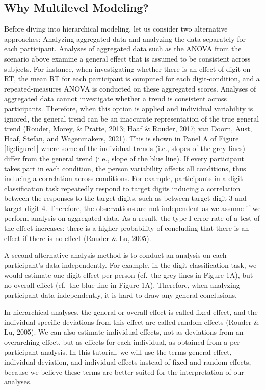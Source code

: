 \documentclass[
  english,
  doc,floatsintext]{apa6}
\begin{document}
\hypertarget{why-multilevel-modeling}{%
\subsection{Why Multilevel Modeling?}\label{why-multilevel-modeling}}

Before diving into hierarchical modeling, let us consider two alternative approaches: Analyzing aggregated data and analyzing the data separately for each participant. Analyses of aggregated data such as the ANOVA from the scenario above examine a general effect that is assumed to be consistent across subjects. For instance, when investigating whether there is an effect of digit on RT, the mean RT for each participant is computed for each digit-condition, and a repeated-measures ANOVA is conducted on these aggregated scores. Analyses of aggregated data cannot investigate whether a trend is consistent across participants. Therefore, when this option is applied and individual variability is ignored, the general trend can be an inaccurate representation of the true general trend (Rouder, Morey, \& Pratte, 2013; Haaf \& Rouder, 2017; van Doorn, Aust, Haaf, Stefan, and Wagenmakers, 2021). This is shown in Panel A of Figure \ref{fig:figure1} where some of the individual trends (i.e., slopes of the grey lines) differ from the general trend (i.e., slope of the blue line). If every participant takes part in each condition, the person variability affects all conditions, thus inducing a correlation across conditions. For example, participants in a digit classification task repeatedly respond to target digits inducing a correlation between the responses to the target digits, such as between target digit 3 and target digit 4. Therefore, the observations are not independent as we assume if we perform analysis on aggregated data. As a result, the type I error rate of a test of the effect increases: there is a higher probability of concluding that there is an effect if there is no effect (Rouder \& Lu, 2005).

A second alternative analysis method is to conduct an analysis on each participant's data independently. For example, in the digit classification task, we would estimate one digit effect per person (cf.~the grey lines in Figure 1A), but no overall effect (cf.~the blue line in Figure 1A). Therefore, when analyzing participant data independently, it is hard to draw any general conclusions.

In hierarchical analyses, the general or overall effect is called fixed effect, and the individual-specific deviations from this effect are called random effects (Rouder \& Lu, 2005). We can also estimate individual effects, not as deviations from an overarching effect, but as effects for each individual, as obtained from a per-participant analysis. In this tutorial, we will use the terms general effect, individual deviation, and individual effects instead of fixed and random effects, because we believe these terms are better suited for the interpretation of our analyses.
\end{document}
